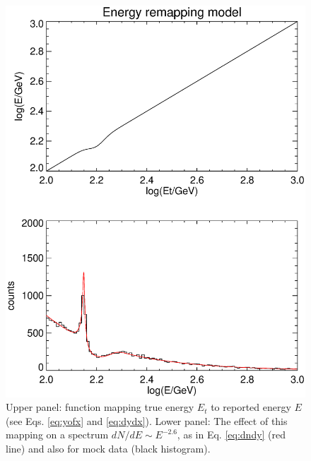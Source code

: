 \documentclass[aps,twocolumn,prd,superscriptaddress,showpacs,nofootinbib,fixfloat]{revtex4}
\begin{document}
\begin{figure}
  \centering
  \includegraphics[width=1.0\linewidth]{plots/limb_bump_model.ps}
  \caption{Upper panel: function mapping true energy $E_t$
  to reported energy $E$ (see Eqs. \ref{eq:yofx} and
  \ref{eq:dydx}). Lower panel: The effect of this mapping
  on a spectrum $dN/dE \sim E^{-2.6}$,
  as in Eq.
  \ref{eq:dndy} (red line) and also for mock data (black
  histogram).}
  \label{fig:bumpmodel}
\end{figure}
\end{document}
